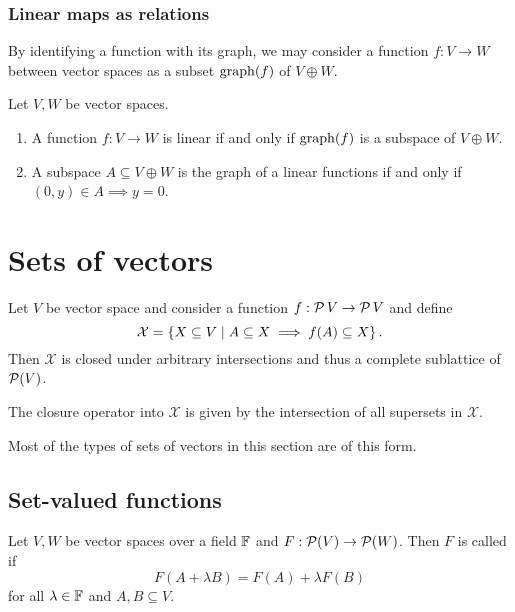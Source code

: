 \subsubsection{Linear maps as relations}
By identifying a function with its graph, we may consider a function $f: V\to W$ between vector spaces as a subset $\operatorname{graph}(f)$ of $V\oplus W$.

\begin{proposition}
Let $V,W$ be vector spaces.
\begin{enumerate}
\item A function $f: V\to W$ is linear \textup{if and only if} $\operatorname{graph}(f)$ is a subspace of $V\oplus W$.
\item A subspace $A\subseteq V\oplus W$ is the graph of a linear functions \textup{if and only if} $(0,y)\in A \implies y=0$.
\end{enumerate}
\end{proposition}

\section{Sets of vectors}
\begin{proposition} \label{latticesOfVectorSubsets}
Let $V$ be vector space and consider a function $f: \operatorname{\mathcal{P}}{V} \to \operatorname{\mathcal{P}}{V}$ and define
\[ \mathcal{X} = \left\{ X\subseteq V \;\middle|\; A \subseteq X \implies f(A)\subseteq X \right\}. \]
Then $\mathcal{X}$ is closed under arbitrary intersections and thus a complete sublattice of $\operatorname{\mathcal{P}}(V)$.

The closure operator into $\mathcal{X}$ is given by the intersection of all supersets in $\mathcal{X}$.
\end{proposition}

Most of the types of sets of vectors in this section are of this form.

\subsection{Set-valued functions}
\begin{definition}
Let $V,W$ be vector spaces over a field $\mathbb{F}$ and $F: \operatorname{\mathcal{P}}(V)\to \operatorname{\mathcal{P}}(W)$. Then $F$ is called  if
\[ F(A+\lambda B) = F(A) + \lambda F(B) \]
for all $\lambda \in \mathbb{F}$ and $A,B\subseteq V$.
\end{definition}

